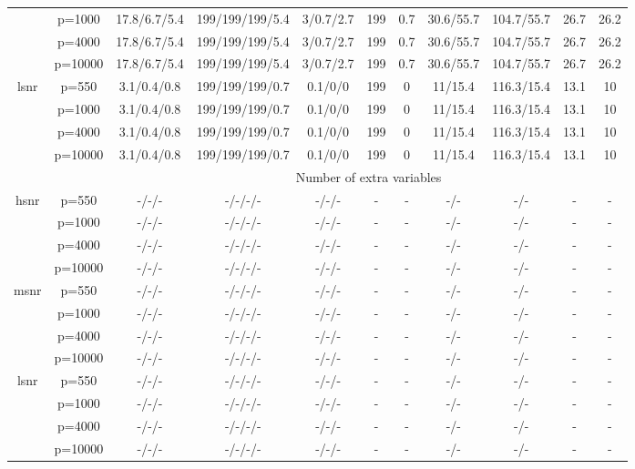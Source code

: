 \begin{table}[ht]
{\begin{tabular}{|c|c|ccccccccc|}
   & p=1000 & 17.8/6.7/5.4 & 199/199/199/5.4 & 3/0.7/2.7 & 199 & 0.7 & 30.6/55.7 & 104.7/55.7 & 26.7 & 26.2 \\ 
   & p=4000 & 17.8/6.7/5.4 & 199/199/199/5.4 & 3/0.7/2.7 & 199 & 0.7 & 30.6/55.7 & 104.7/55.7 & 26.7 & 26.2 \\ 
   & p=10000 & 17.8/6.7/5.4 & 199/199/199/5.4 & 3/0.7/2.7 & 199 & 0.7 & 30.6/55.7 & 104.7/55.7 & 26.7 & 26.2 \\ 
  \midrule\multirow{4}[2]{*}{lsnr} & p=550 & 3.1/0.4/0.8 & 199/199/199/0.7 & 0.1/0/0 & 199 & 0 & 11/15.4 & 116.3/15.4 & 13.1 & 10 \\ 
   & p=1000 & 3.1/0.4/0.8 & 199/199/199/0.7 & 0.1/0/0 & 199 & 0 & 11/15.4 & 116.3/15.4 & 13.1 & 10 \\ 
   & p=4000 & 3.1/0.4/0.8 & 199/199/199/0.7 & 0.1/0/0 & 199 & 0 & 11/15.4 & 116.3/15.4 & 13.1 & 10 \\ 
   & p=10000 & 3.1/0.4/0.8 & 199/199/199/0.7 & 0.1/0/0 & 199 & 0 & 11/15.4 & 116.3/15.4 & 13.1 & 10 \\ 
   \midrule 
 \multicolumn{1}{|c}{} &       & \multicolumn{9}{c|}{Number of extra variables} \\
\midrule\multirow{4}[2]{*}{hsnr} & p=550 & -/-/- & -/-/-/- & -/-/- & - & - & -/- & -/- & - & - \\ 
   & p=1000 & -/-/- & -/-/-/- & -/-/- & - & - & -/- & -/- & - & - \\ 
   & p=4000 & -/-/- & -/-/-/- & -/-/- & - & - & -/- & -/- & - & - \\ 
   & p=10000 & -/-/- & -/-/-/- & -/-/- & - & - & -/- & -/- & - & - \\ 
  \midrule\multirow{4}[2]{*}{msnr} & p=550 & -/-/- & -/-/-/- & -/-/- & - & - & -/- & -/- & - & - \\ 
   & p=1000 & -/-/- & -/-/-/- & -/-/- & - & - & -/- & -/- & - & - \\ 
   & p=4000 & -/-/- & -/-/-/- & -/-/- & - & - & -/- & -/- & - & - \\ 
   & p=10000 & -/-/- & -/-/-/- & -/-/- & - & - & -/- & -/- & - & - \\ 
  \midrule\multirow{4}[2]{*}{lsnr} & p=550 & -/-/- & -/-/-/- & -/-/- & - & - & -/- & -/- & - & - \\ 
   & p=1000 & -/-/- & -/-/-/- & -/-/- & - & - & -/- & -/- & - & - \\ 
   & p=4000 & -/-/- & -/-/-/- & -/-/- & - & - & -/- & -/- & - & - \\ 
   & p=10000 & -/-/- & -/-/-/- & -/-/- & - & - & -/- & -/- & - & - \\ 
   \bottomrule 
\end{tabular}
}
\end{table}
